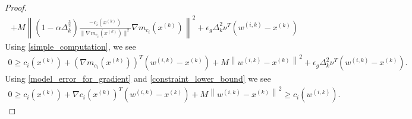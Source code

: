 \documentclass{article}
\theoremstyle{case}
\newcommand{\xk}{{x^{(k)}}}
\newcommand{\dk}{\Delta_k}
\newcommand{\wik}{{w^{(i, k)}}}
\newcommand{\gmcik}{{\nabla m_{c_i}(\xk)}}
\begin{document}
\begin{proof}
\begin{align*}
+ M \left\|\left(1 - \alpha \dk^{\frac 3 2 }\right)\frac{-c_i(\xk)}{\|\gmcik\|^2}\gmcik\right\|^2
+ \epsilon_g \dk^2\nu^T \left(\wik - \xk\right)
\end{align*}
Using \cref{simple_computation}, we see
\begin{align*}
0 \ge c_i(\xk) + \left(\gmcik\right)^T\left(\wik - \xk\right)+ M \left\|\wik - \xk\right\|^2  + \epsilon_g \dk^2\nu^T \left(\wik - \xk\right).
\end{align*}
Using \cref{model_error_for_gradient} and \cref{constraint_lower_bound} we see
\begin{align*}
0 \ge c_i(\xk) + \nabla c_i(\xk)^T\left(\wik - \xk \right) + M \left\|\wik - \xk\right\|^2 \ge c_i(\wik). 
\end{align*}

% 
% 



\end{proof}
\end{document}
